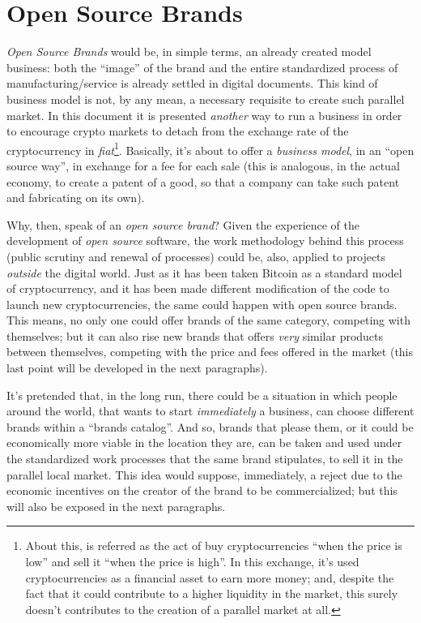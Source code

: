 \documentclass[12pt,a4paper]{article}
\begin{document}
\section{Open Source Brands}
\textit{Open Source Brands} would be, in simple terms, an already created model business: both the “image” of the brand and the entire standardized process of manufacturing/service is already settled in digital documents. This kind of business model is not, by any mean, a necessary requisite to create such parallel market. In this document it is presented \textit{another} way to run a business in order to encourage crypto markets to detach from the exchange rate of the cryptocurrency in \textit{fiat}\footnote{About this, is referred as the act of buy cryptocurrencies “when the price is low” and sell it “when the price is high”. In this exchange, it's used cryptocurrencies as a financial asset to earn more money; and, despite the fact that it could contribute to a higher liquidity in the market, this surely doesn't contributes to the creation of a parallel market at all.}. Basically, it's about to offer a \textit{business model}, in an “open source way”, in exchange for a fee for each sale (this is analogous, in the actual economy, to create a patent of a good, so that a company can take such patent and fabricating on its own).

Why, then, speak of an \textit{open source brand}? Given the experience of the development of \textit{open source} software, the work methodology behind this process (public scrutiny and renewal of processes) could be, also, applied to projects \textit{outside} the digital world. Just as it has been taken Bitcoin as a standard model of cryptocurrency, and it has been made different modification of the code to launch new cryptocurrencies, the same could happen with open source brands. This means, no only one could offer brands of the same category, competing with themselves; but it can also rise new brands that offers \textit{very} similar products between themselves, competing with the price and fees offered in the market (this last point will be developed in the next paragraphs).

It's pretended that, in the long run, there could be a situation in which people around the world, that wants to start \textit{immediately} a business, can choose different brands within a “brands catalog”. And so, brands that please them, or it could be economically more viable in the location they are, can be taken and used under the standardized work processes that the same brand stipulates, to sell it in the parallel local market. This idea would suppose, immediately, a reject due to the economic incentives on the creator of the brand to be commercialized; but this will also be exposed in the next paragraphs.
\end{document}
